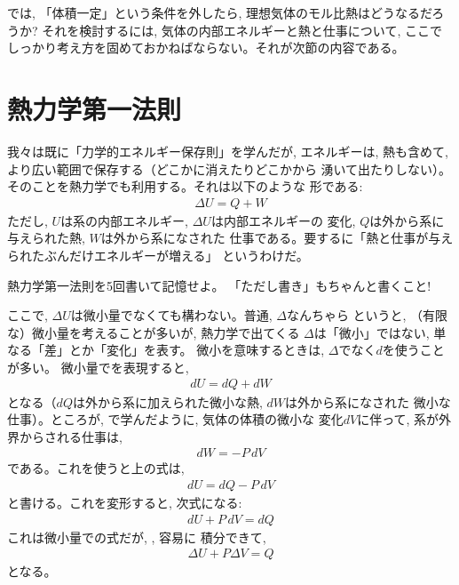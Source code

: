 では, 「体積一定」という条件を外したら, 理想気体のモル比熱はどうなるだろうか?
それを検討するには, 気体の内部エネルギーと熱と仕事について, ここで
しっかり考え方を固めておかねばならない。それが次節の内容である。\\



\section{熱力学第一法則}

我々は既に「力学的エネルギー保存則」を学んだが, エネルギーは, 
熱も含めて, より広い範囲で保存する（どこかに消えたりどこかから
湧いて出たりしない）。そのことを熱力学でも利用する。それは以下のような
形である:
\begin{eqnarray}
\Delta U=Q+W\label{eq:thermlaw1}
\end{eqnarray}
ただし, $U$は系の内部エネルギー, $\Delta U$は内部エネルギーの
変化, $Q$は外から系に与えられた熱, $W$は外から系になされた
仕事である。要するに「熱と仕事が与えられたぶんだけエネルギーが増える」
というわけだ。

\begin{q}\label{q:themlaw1} 熱力学第一法則を5回書いて記憶せよ。
「ただし書き」もちゃんと書くこと!\end{q}\mv

ここで, $\Delta U$は微小量でなくても構わない。普通, $\Delta$なんちゃら
というと, （有限な）微小量を考えることが多いが, 熱力学で出てくる
$\Delta$は「微小」ではない, 単なる「差」とか「変化」を表す。
微小を意味するときは, $\Delta$でなく$d$を使うことが多い。
微小量でを表現すると, 
\begin{eqnarray}
dU=dQ+dW\label{eq:thermlaw1inf}
\end{eqnarray}
となる（$dQ$は外から系に加えられた微小な熱, $dW$は外から系になされた
微小な仕事）。ところが, で学んだように, 気体の体積の微小な
変化$dV$に伴って, 系が外界からされる仕事は, 
\begin{eqnarray}dW=-P\,dV\end{eqnarray}
である。これを使うと上の式は, 
\begin{eqnarray}
dU=dQ-P\,dV\label{/eq:thermlaw1infPdV}
\end{eqnarray}
と書ける。これを変形すると, 次式になる: 
\begin{eqnarray}
dU+P\,dV=dQ\label{eq:thermlaw1infPdV2}
\end{eqnarray}
これは微小量での式だが, , 容易に
積分できて, 
\begin{eqnarray}
\Delta U+P\Delta V=Q\label{eq:thermlaw1infPdV3}
\end{eqnarray}
となる。


